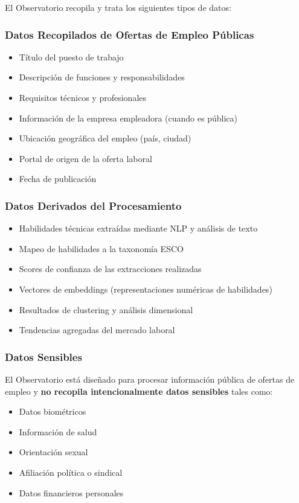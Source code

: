 \documentclass[11pt,oneside,letterpaper]{article}
\begin{document}
El Observatorio recopila y trata los siguientes tipos de datos:

\subsubsection{Datos Recopilados de Ofertas de Empleo Públicas}

\begin{itemize}
    \item Título del puesto de trabajo
    \item Descripción de funciones y responsabilidades
    \item Requisitos técnicos y profesionales
    \item Información de la empresa empleadora (cuando es pública)
    \item Ubicación geográfica del empleo (país, ciudad)
    \item Portal de origen de la oferta laboral
    \item Fecha de publicación
\end{itemize}

\subsubsection{Datos Derivados del Procesamiento}

\begin{itemize}
    \item Habilidades técnicas extraídas mediante NLP y análisis de texto
    \item Mapeo de habilidades a la taxonomía ESCO
    \item Scores de confianza de las extracciones realizadas
    \item Vectores de embeddings (representaciones numéricas de habilidades)
    \item Resultados de clustering y análisis dimensional
    \item Tendencias agregadas del mercado laboral
\end{itemize}

\subsubsection{Datos Sensibles}

El Observatorio está diseñado para procesar información pública de ofertas de empleo y \textbf{no recopila intencionalmente datos sensibles} tales como:

\begin{itemize}
    \item Datos biométricos
    \item Información de salud
    \item Orientación sexual
    \item Afiliación política o sindical
    \item Datos financieros personales
\end{itemize}
\end{document}
